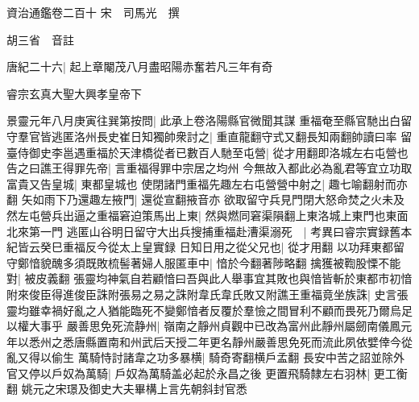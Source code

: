 資治通鑑卷二百十
宋　司馬光　撰

胡三省　音註

唐紀二十六|{
	起上章閹茂八月盡昭陽赤奮若凡三年有奇}


睿宗玄真大聖大興孝皇帝下

景靈元年八月庚寅往巽第按問|{
	此承上卷洛陽縣官微聞其謀}
重福奄至縣官馳出白留守羣官皆逃匿洛州長史崔日知獨帥衆討之|{
	重直龍翻守式又翻長知兩翻帥讀曰率}
留臺侍御史李邕遇重福於天津橋從者已數百人馳至屯營|{
	從才用翻即洛城左右屯營也}
告之曰譙王得罪先帝|{
	言重福得罪中宗居之均州}
今無故入都此必為亂君等宜立功取富貴又告皇城|{
	東都皇城也}
使閉諸門重福先趣左右屯營營中射之|{
	趣七喻翻射而亦翻}
矢如雨下乃還趣左掖門|{
	還從宣翻掖音亦}
欲取留守兵見門閉大怒命焚之火未及然左屯營兵出逼之重福窘迫策馬出上東|{
	然與燃同窘渠隕翻上東洛城上東門也東面北來第一門}
逃匿山谷明日留守大出兵搜捕重福赴漕渠溺死　|{
	考異曰睿宗實録舊本紀皆云癸巳重福反今從太上皇實録}
日知日用之從父兄也|{
	從才用翻}
以功拜東都留守鄭愔貌醜多須既敗梳髻著婦人服匿車中|{
	愔於今翻著陟略翻}
擒獲被鞫股慄不能對|{
	被皮義翻}
張靈均神氣自若顧愔曰吾與此人舉事宜其敗也與愔皆斬於東都市初愔附來俊臣得進俊臣誅附張易之易之誅附韋氏韋氏敗又附譙王重福竟坐族誅|{
	史言張靈均雖幸禍好亂之人猶能臨死不變鄭愔者反覆於羣憸之間冒利不顧而畏死乃爾烏足以權大事乎}
嚴善思免死流静州|{
	嶺南之靜州貞觀中已改為富州此靜州屬劒南儀鳳元年以悉州之悉唐縣置南和州武后天授二年更名靜州嚴善思免死而流此夙依嬖倖今從亂又得以偷生}
萬騎恃討諸韋之功多暴横|{
	騎奇寄翻横戶孟翻}
長安中苦之詔並除外官又停以戶奴為萬騎|{
	戶奴為萬騎盖必起於永昌之後}
更置飛騎隸左右羽林|{
	更工衡翻}
姚元之宋璟及御史大夫畢構上言先朝斜封官悉

